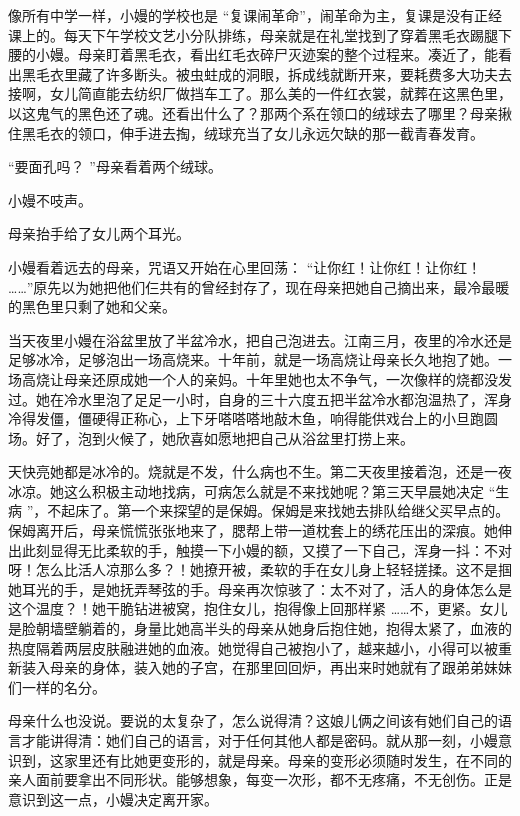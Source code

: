 \documentclass[12pt,twoside,openany]{book}
\begin{document}
像所有中学一样，小嫚的学校也是 “复课闹革命”，闹革命为主，复课是没有正经课上的。每天下午学校文艺小分队排练，母亲就是在礼堂找到了穿着黑毛衣踢腿下腰的小嫚。母亲盯着黑毛衣，看出红毛衣碎尸灭迹案的整个过程来。凑近了，能看出黑毛衣里藏了许多断头。被虫蛀成的洞眼，拆成线就断开来，要耗费多大功夫去接啊，女儿简直能去纺织厂做挡车工了。那么美的一件红衣裳，就葬在这黑色里，以这鬼气的黑色还了魂。还看出什么了？那两个系在领口的绒球去了哪里？母亲揪住黑毛衣的领口，伸手进去掏，绒球充当了女儿永远欠缺的那一截青春发育。

“要面孔吗？ ”母亲看着两个绒球。

小嫚不吱声。

母亲抬手给了女儿两个耳光。

小嫚看着远去的母亲，咒语又开始在心里回荡： “让你红！让你红！让你红！ ……”原先以为她把他们仨共有的曾经封存了，现在母亲把她自己摘出来，最冷最暖的黑色里只剩了她和父亲。

当天夜里小嫚在浴盆里放了半盆冷水，把自己泡进去。江南三月，夜里的冷水还是足够冰冷，足够泡出一场高烧来。十年前，就是一场高烧让母亲长久地抱了她。一场高烧让母亲还原成她一个人的亲妈。十年里她也太不争气，一次像样的烧都没发过。她在冷水里泡了足足一小时，自身的三十六度五把半盆冷水都泡温热了，浑身冷得发僵，僵硬得正称心，上下牙嗒嗒嗒地敲木鱼，响得能供戏台上的小旦跑圆场。好了，泡到火候了，她欣喜如愿地把自己从浴盆里打捞上来。

天快亮她都是冰冷的。烧就是不发，什么病也不生。第二天夜里接着泡，还是一夜冰凉。她这么积极主动地找病，可病怎么就是不来找她呢？第三天早晨她决定 “生病 ”，不起床了。第一个来探望的是保姆。保姆是来找她去排队给继父买早点的。保姆离开后，母亲慌慌张张地来了，腮帮上带一道枕套上的绣花压出的深痕。她伸出此刻显得无比柔软的手，触摸一下小嫚的额，又摸了一下自己，浑身一抖：不对呀！怎么比活人凉那么多？！她撩开被，柔软的手在女儿身上轻轻搓揉。这不是掴她耳光的手，是她抚弄琴弦的手。母亲再次惊骇了：太不对了，活人的身体怎么是这个温度？！她干脆钻进被窝，抱住女儿，抱得像上回那样紧 ……不，更紧。女儿是脸朝墙壁躺着的，身量比她高半头的母亲从她身后抱住她，抱得太紧了，血液的热度隔着两层皮肤融进她的血液。她觉得自己被抱小了，越来越小，小得可以被重新装入母亲的身体，装入她的子宫，在那里回回炉，再出来时她就有了跟弟弟妹妹们一样的名分。

母亲什么也没说。要说的太复杂了，怎么说得清？这娘儿俩之间该有她们自己的语言才能讲得清：她们自己的语言，对于任何其他人都是密码。就从那一刻，小嫚意识到，这家里还有比她更变形的，就是母亲。母亲的变形必须随时发生，在不同的亲人面前要拿出不同形状。能够想象，每变一次形，都不无疼痛，不无创伤。正是意识到这一点，小嫚决定离开家。
\end{document}
